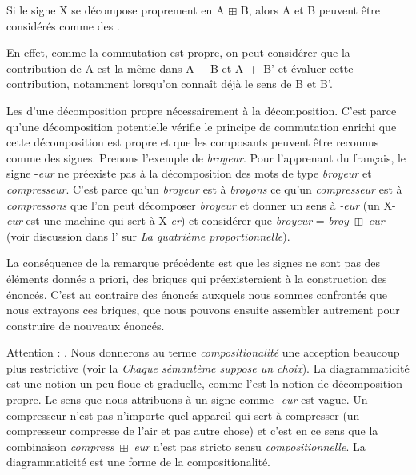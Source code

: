 {Si le signe X se décompose proprement en A ${\boxplus}$ B, alors A et B peuvent être considérés comme des .}

 En effet, comme la commutation est propre, on peut considérer que la contribution de A est la même dans A + B et A~+~B’ et évaluer cette contribution, notamment lorsqu’on connaît déjà le sens de B et B’.

Les  d’une décomposition propre  nécessairement à la décomposition. C’est parce qu’une décomposition potentielle vérifie le principe de commutation enrichi que cette décomposition est propre et que les composants peuvent être reconnus comme des signes. Prenons l’exemple de \textit{broyeur}. Pour l’apprenant du français, le signe -\textit{eur} ne préexiste pas à la décomposition des mots de type \textit{broyeur} et \textit{compresseur}. C’est parce qu’un \textit{broyeur} est à \textit{broyons} ce qu’un \textit{compresseur} est à \textit{compressons} que l’on peut décomposer \textit{broyeur} et donner un sens à \textit{{}-eur} (un X-\textit{eur} est une machine qui sert à X-\textit{er}) et considérer que \textit{broyeur} = \textit{broy}~${\boxplus}$~\textit{eur} (voir discussion dans l’ sur \textit{La quatrième proportionnelle}).

La conséquence de la remarque précédente est que les signes ne sont pas des éléments donnés a priori, des briques qui préexisteraient à la construction des énoncés. C’est au contraire des énoncés auxquels nous sommes confrontés que nous extrayons ces briques, que nous pouvons ensuite assembler autrement pour construire de nouveaux énoncés.

Attention : . Nous donnerons au terme \textit{compositionalité} une acception beaucoup plus restrictive (voir la  \textit{Chaque sémantème suppose un choix}). La diagrammaticité est une notion un peu floue et graduelle, comme l’est la notion de décomposition propre. Le sens que nous attribuons à un signe comme \textit{{}-eur} est vague. Un compresseur n’est pas n’importe quel appareil qui sert à compresser (un compresseur compresse de l’air et pas autre chose) et c’est en ce sens que la combinaison \textit{compress}~${\boxplus}$~\textit{eur} n’est pas stricto sensu \textit{compositionnelle}. La diagrammaticité est une forme  de la compositionalité.

